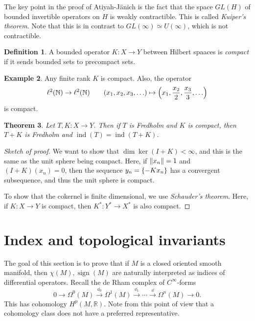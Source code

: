 \documentclass[leqno, openany]{memoir}
\newtheorem{thm}{Theorem}[section]
\theoremstyle{definition}
\newtheorem{defn}[thm]{Definition}
\newtheorem{exm}[thm]{Example}
\theoremstyle{remark}
\theoremstyle{plain}
\theoremstyle{definition}
\theoremstyle{remark}
\newcommand{\N}{\mathbb{N}}
\newcommand{\R}{\mathbb{R}}
\DeclareMathOperator{\sign}{sign}
\DeclareMathOperator{\ind}{ind}
\begin{document}
The key point in the proof of Atiyah-J\"anich is the fact that the space
$GL(H)$ of bounded invertible operators on $H$ is weakly contractible. This is
called \textit{Kuiper's theorem}. Note that this is in contrast to $GL(\infty)
\simeq U(\infty)$, which is not contractible.

\begin{defn} A bounded operator $K \colon X \to Y$ between Hilbert spaaces is
\textit{compact} if it sends bounded sets to precompact sets.  \end{defn}

\begin{exm} Any finite rank $K$ is compact. Also, the operator \[ \ell^2(\N)
\to \ell^2(\N) \qquad (x_1, x_2, x_3, \ldots) \mapsto \qty(x_1, \frac{x_2}{2},
\frac{x_3}{3}, \ldots) \] is compact.  \end{exm}

\begin{thm} Let $T, K \colon X \to Y$. Then if $T$ is Fredholm and $K$ is
compact, then $T+K$ is Fredholm and $\ind(T) = \ind(T+K)$.  \end{thm}

\begin{proof}[Sketch of proof] We want to show that $\dim \ker(I+K) < \infty$,
    and this is the same as the unit sphere being compact. Here, if $\norm{x_n}
    = 1$ and $(I+K)(x_n) = 0$, then the sequence $y_n = \qty{-K x_n}$ has a
    convergent subsequence, and thus the unit sphere is compact.

    To show that the cokernel is finite dimensional, we use \textit{Schauder's
theorem}. Here, if $K \colon X \to Y$ is compact, then $K^* \colon Y^* \to X^*$
is also compact.  \end{proof}

\section{Index and topological invariants}%
\label{sec:index_and_topological_invariants}

The goal of this section is to prove that if $M$ is a closed oriented smooth
manifold, then $\chi(M), \sign(M)$ are naturally interpreted as indices of
differential operators. Recall the de Rham complex of $C^{\infty}$-forms \[ 0
\to \Omega^0(M) \xrightarrow{\dd_0} \Omega^1(M) \xrightarrow{\dd_1} \cdots
\xrightarrow{\dd} \Omega^n (M) \to 0. \] This has cohomology $H^p(M, \R)$. Note
from this point of view that a cohomology class does not have a preferred
representative. 
\end{document}
